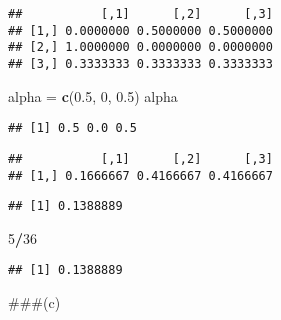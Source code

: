\documentclass[]{article}
\newenvironment{Shaded}{\begin{snugshade}}{\end{snugshade}}
\newcommand{\DecValTok}[1]{\textcolor[rgb]{0.00,0.00,0.81}{#1}}
\newcommand{\FloatTok}[1]{\textcolor[rgb]{0.00,0.00,0.81}{#1}}
\newcommand{\KeywordTok}[1]{\textcolor[rgb]{0.13,0.29,0.53}{\textbf{#1}}}
\newcommand{\NormalTok}[1]{#1}
\newcommand{\OperatorTok}[1]{\textcolor[rgb]{0.81,0.36,0.00}{\textbf{#1}}}
\newcommand{\StringTok}[1]{\textcolor[rgb]{0.31,0.60,0.02}{#1}}
\begin{document}
\begin{verbatim}
##           [,1]      [,2]      [,3]
## [1,] 0.0000000 0.5000000 0.5000000
## [2,] 1.0000000 0.0000000 0.0000000
## [3,] 0.3333333 0.3333333 0.3333333
\end{verbatim}

\begin{Shaded}
\begin{Highlighting}[]
\NormalTok{alpha =}\StringTok{ }\KeywordTok{c}\NormalTok{(}\FloatTok{0.5}\NormalTok{, }\DecValTok{0}\NormalTok{, }\FloatTok{0.5}\NormalTok{)}
\NormalTok{alpha}
\end{Highlighting}
\end{Shaded}

\begin{verbatim}
## [1] 0.5 0.0 0.5
\end{verbatim}

\begin{Shaded}
\end{Shaded}

\begin{verbatim}
##           [,1]      [,2]      [,3]
## [1,] 0.1666667 0.4166667 0.4166667
\end{verbatim}

\begin{Shaded}
\end{Shaded}

\begin{verbatim}
## [1] 0.1388889
\end{verbatim}

\begin{Shaded}
\begin{Highlighting}[]
\DecValTok{5}\OperatorTok{/}\DecValTok{36}
\end{Highlighting}
\end{Shaded}

\begin{verbatim}
## [1] 0.1388889
\end{verbatim}

\#\#\#(c)
\end{document}
